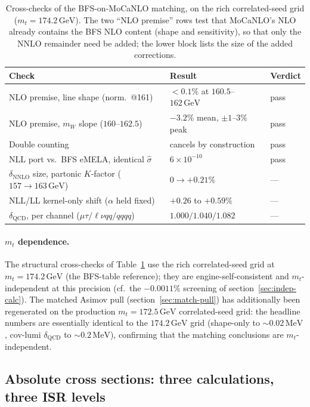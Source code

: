 \documentclass[11pt,a4paper]{article}
\newcommand{\mW}{m_W}
\newcommand{\GeV}{\ensuremath{\,\mathrm{GeV}}}
\newcommand{\MeV}{\ensuremath{\,\mathrm{MeV}}}
\begin{document}
\begin{table}[t]
\centering
\begin{tabular}{l l l}
\toprule
Check & Result & Verdict \\
\midrule
NLO premise, line shape (norm.\ @161) & $<0.1\%$ at $160.5$--$162\GeV$ & pass \\
NLO premise, $\mW$ slope ($160$--$162.5$) & $-3.2\%$ mean, $\pm1$--$3\%$ peak & pass \\
Double counting & cancels by construction & pass \\
NLL port vs.\ BFS eMELA, identical $\hat\sigma$ & $6\times10^{-10}$ & pass \\
\midrule
$\delta_\text{NNLO}$ size, partonic $K$-factor ($157\!\to\!163\GeV$) & $0 \to +0.21\%$ & --- \\
NLL/LL kernel-only shift ($\alpha$ held fixed) & $+0.26$ to $+0.59\%$ & --- \\
$\delta_\text{QCD}$, per channel ($\mu\tau/\ell\nu qq/qqqq$) & $1.000/1.040/1.082$ & --- \\
\bottomrule
\end{tabular}
\caption{Cross-checks of the BFS-on-MoCaNLO matching, on the
rich correlated-seed grid ($m_t=174.2\GeV$). The two ``NLO premise'' rows test that
MoCaNLO's NLO already contains the BFS NLO content (shape and sensitivity), so that
only the NNLO remainder need be added; the lower block lists the size of the added
corrections.}
\label{tab:match-val}
\end{table}

\paragraph{$m_t$ dependence.} The structural cross-checks of
Table~\ref{tab:match-val} use the rich correlated-seed grid at $m_t=174.2\GeV$ (the
BFS-table reference); they are engine-self-consistent and $m_t$-independent at this
precision (cf.\ the $-0.0011\%$ screening of section~\ref{sec:indep-calc}). The
matched Asimov pull (section~\ref{sec:match-pull}) has additionally been regenerated
on the production $m_t=172.5\GeV$ correlated-seed grid: the headline numbers are
essentially identical to the $174.2\GeV$ grid (shape-only to $\sim\!0.02\MeV$,
cov-lumi $\delta_\text{QCD}$ to $\sim\!0.2\MeV$), confirming that the matching
conclusions are $m_t$-independent.

\subsection{Absolute cross sections: three calculations, three ISR levels}
\label{sec:match-threecalc}
\end{document}
